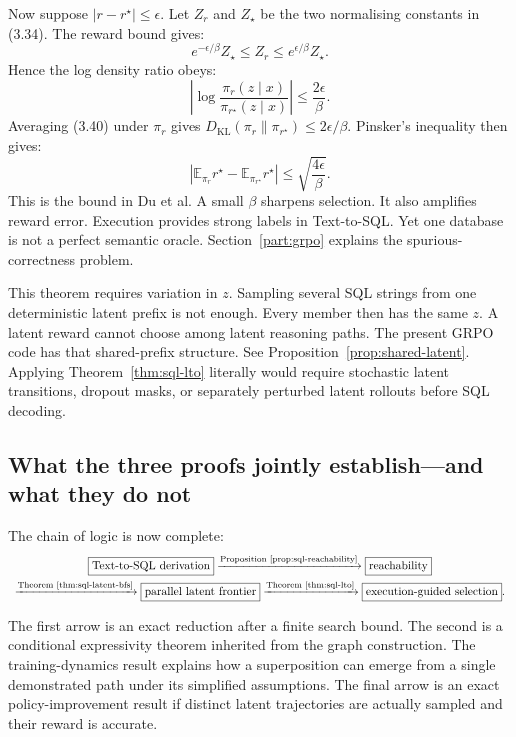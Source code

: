 \documentclass[11pt]{article}
\theoremstyle{definition}
\begin{document}
Now suppose $|r-r^\star|\le\epsilon$. Let $Z_r$ and $Z_\star$ be the two normalising constants in (3.34). The reward bound gives:
\[
e^{-\epsilon/\beta}Z_\star
\le Z_r\le
e^{\epsilon/\beta}Z_\star.
\tag{3.39}
\]
Hence the log density ratio obeys:
\[
\left|\log\frac{\pi_r(z\mid x)}{\pi_{r^\star}(z\mid x)}\right|
\le\frac{2\epsilon}{\beta}.
\tag{3.40}
\]
Averaging (3.40) under $\pi_r$ gives $D_{\mathrm{KL}}(\pi_r\|\pi_{r^\star})\le2\epsilon/\beta$. Pinsker's inequality then gives:
\[
\left|
\mathbb E_{\pi_r}r^\star-
\mathbb E_{\pi_{r^\star}}r^\star
\right|
\le\sqrt{\frac{4\epsilon}{\beta}}.
\tag{3.41}
\]
This is the bound in Du et al. A small $\beta$ sharpens selection. It also amplifies reward error. Execution provides strong labels in Text-to-SQL. Yet one database is not a perfect semantic oracle. Section~\ref{part:grpo} explains the spurious-correctness problem.

This theorem requires variation in $z$. Sampling several SQL strings from one deterministic latent prefix is not enough. Every member then has the same $z$. A latent reward cannot choose among latent reasoning paths. The present GRPO code has that shared-prefix structure. See Proposition~\ref{prop:shared-latent}. Applying Theorem~\ref{thm:sql-lto} literally would require stochastic latent transitions, dropout masks, or separately perturbed latent rollouts before SQL decoding.

\subsection{What the three proofs jointly establish---and what they do not}

The chain of logic is now complete:
\[
\begin{array}{c}
\boxed{\text{Text-to-SQL derivation}}
\xrightarrow{\text{Proposition~\ref{prop:sql-reachability}}}
\boxed{\text{reachability}}\\[6pt]
\xrightarrow{\text{Theorem~\ref{thm:sql-latent-bfs}}}
\boxed{\text{parallel latent frontier}}
\xrightarrow{\text{Theorem~\ref{thm:sql-lto}}}
\boxed{\text{execution-guided selection}}.
\end{array}
\]

The first arrow is an exact reduction after a finite search bound. The second is a conditional expressivity theorem inherited from the graph construction. The training-dynamics result explains how a superposition can emerge from a single demonstrated path under its simplified assumptions. The final arrow is an exact policy-improvement result if distinct latent trajectories are actually sampled and their reward is accurate.
\end{document}
